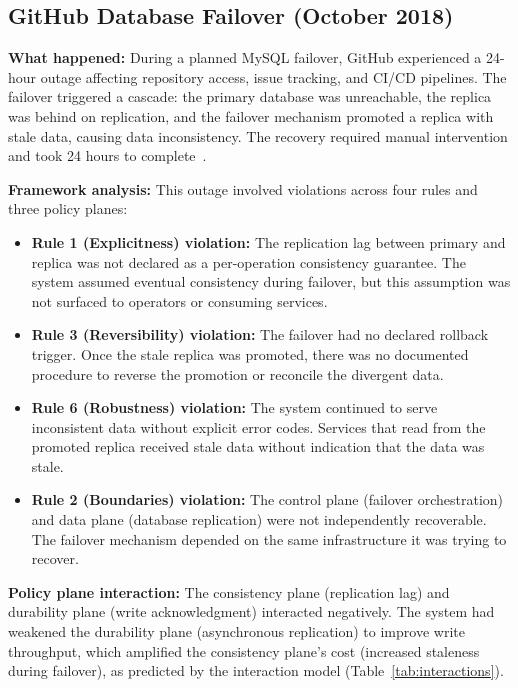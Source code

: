 \documentclass[conference]{IEEEtran}
\begin{document}
\subsection{GitHub Database Failover (October 2018)}

\textbf{What happened:} During a planned MySQL failover, GitHub experienced a 24-hour outage affecting repository access, issue tracking, and CI/CD pipelines. The failover triggered a cascade: the primary database was unreachable, the replica was behind on replication, and the failover mechanism promoted a replica with stale data, causing data inconsistency. The recovery required manual intervention and took 24 hours to complete~\cite{github2018}.

\textbf{Framework analysis:} This outage involved violations across four rules and three policy planes:

\begin{itemize}
    \item \textbf{Rule 1 (Explicitness) violation:} The replication lag between primary and replica was not declared as a per-operation consistency guarantee. The system assumed eventual consistency during failover, but this assumption was not surfaced to operators or consuming services.
    
    \item \textbf{Rule 3 (Reversibility) violation:} The failover had no declared rollback trigger. Once the stale replica was promoted, there was no documented procedure to reverse the promotion or reconcile the divergent data.
    
    \item \textbf{Rule 6 (Robustness) violation:} The system continued to serve inconsistent data without explicit error codes. Services that read from the promoted replica received stale data without indication that the data was stale.
    
    \item \textbf{Rule 2 (Boundaries) violation:} The control plane (failover orchestration) and data plane (database replication) were not independently recoverable. The failover mechanism depended on the same infrastructure it was trying to recover.
\end{itemize}

\textbf{Policy plane interaction:} The consistency plane (replication lag) and durability plane (write acknowledgment) interacted negatively. The system had weakened the durability plane (asynchronous replication) to improve write throughput, which amplified the consistency plane's cost (increased staleness during failover), as predicted by the interaction model (Table~\ref{tab:interactions}).
\end{document}

